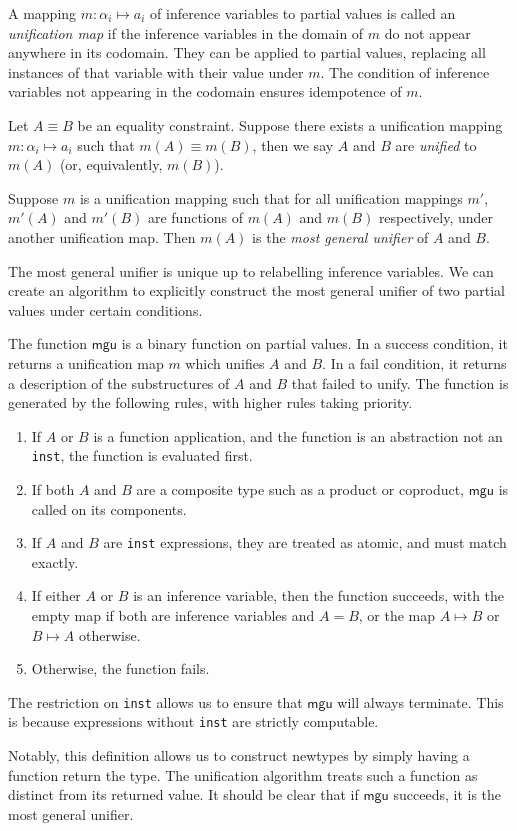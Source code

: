 \documentclass[11pt]{book}
\begin{document}
\begin{defn}
  A mapping \( m: \alpha_i \mapsto a_i \) of inference variables to partial values is called an \textit{unification map} if the inference variables in the domain of \( m \) do not appear anywhere in its codomain.
  They can be applied to partial values, replacing all instances of that variable with their value under \( m \).
  The condition of inference variables not appearing in the codomain ensures idempotence of \( m \).

  Let \( A \equiv B \) be an equality constraint.
  Suppose there exists a unification mapping \( m: \alpha_i \mapsto a_i \) such that \( m(A) \equiv m(B) \), then we say \( A \) and \( B \) are \textit{unified} to \( m(A) \) (or, equivalently, \( m(B) \)).

  Suppose \( m \) is a unification mapping such that for all unification mappings \( m' \), \( m'(A) \) and \( m'(B) \) are functions of \( m(A) \) and \( m(B) \) respectively, under another unification map.
  Then \( m(A) \) is the \textit{most general unifier} of \( A \) and \( B \).
\end{defn}
The most general unifier is unique up to relabelling inference variables.
We can create an algorithm to explicitly construct the most general unifier of two partial values under certain conditions.
\begin{defn}
  The function \( \mathsf{mgu} \) is a binary function on partial values.
  In a success condition, it returns a unification map \( m \) which unifies \( A \) and \( B \).
  In a fail condition, it returns a description of the substructures of \( A \) and \( B \) that failed to unify.
  The function is generated by the following rules, with higher rules taking priority.
  \begin{enumerate}
    \item If \( A \) or \( B \) is a function application, and the function is an abstraction not an \lstinline{inst}, the function is evaluated first.
    \item If both \( A \) and \( B \) are a composite type such as a product or coproduct, \( \mathsf{mgu} \) is called on its components.
    \item If \( A \) and \( B \) are \lstinline{inst} expressions, they are treated as atomic, and must match exactly.
    \item If either \( A \) or \( B \) is an inference variable, then the function succeeds, with the empty map if both are inference variables and \( A = B \), or the map \( A \mapsto B \) or \( B \mapsto A \) otherwise.
    \item Otherwise, the function fails.
  \end{enumerate}
  The restriction on \lstinline{inst} allows us to ensure that \( \mathsf{mgu} \) will always terminate.
  This is because expressions without \lstinline{inst} are strictly computable. %
\end{defn}
Notably, this definition allows us to construct newtypes by simply having a function return the type.
The unification algorithm treats such a function as distinct from its returned value.
It should be clear that if \( \mathsf{mgu} \) succeeds, it is the most general unifier.
\end{document}
